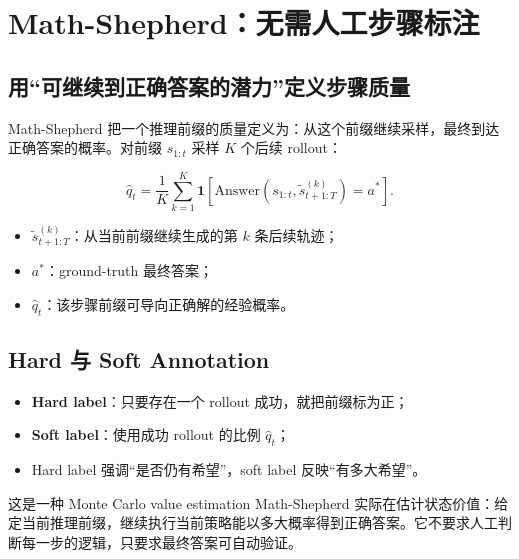 \section{Math-Shepherd：无需人工步骤标注}

\subsection{用“可继续到正确答案的潜力”定义步骤质量}

Math-Shepherd 把一个推理前缀的质量定义为：从这个前缀继续采样，最终到达正确答案的概率。对前缀 $s_{1:t}$ 采样 $K$ 个后续 rollout：

$$
\hat q_t=\frac{1}{K}\sum_{k=1}^{K}
\mathbf 1\!\left[\mathrm{Answer}(s_{1:t},\tilde s^{(k)}_{t+1:T})=a^*\right].
$$

\begin{itemize}
    \item $\tilde s^{(k)}_{t+1:T}$：从当前前缀继续生成的第 $k$ 条后续轨迹；
    \item $a^*$：ground-truth 最终答案；
    \item $\hat q_t$：该步骤前缀可导向正确解的经验概率。
\end{itemize}


\subsection{Hard 与 Soft Annotation}

\begin{itemize}
    \item \textbf{Hard label}：只要存在一个 rollout 成功，就把前缀标为正；
    \item \textbf{Soft label}：使用成功 rollout 的比例 $\hat q_t$；
    \item Hard label 强调“是否仍有希望”，soft label 反映“有多大希望”。
\end{itemize}


\begin{knowledgebox}{这是一种 Monte Carlo value estimation}
Math-Shepherd 实际在估计状态价值：给定当前推理前缀，继续执行当前策略能以多大概率得到正确答案。它不要求人工判断每一步的逻辑，只要求最终答案可自动验证。
\end{knowledgebox}

